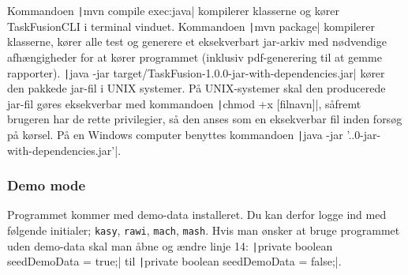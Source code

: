 Kommandoen \texttt|mvn compile exec:java| kompilerer klasserne og kører TaskFusionCLI i terminal vinduet.\newline
Kommandoen \texttt|mvn package| kompilerer klasserne, kører alle test og generere et eksekverbart jar-arkiv med nødvendige afhængigheder for at kører programmet (inklusiv pdf-generering til at gemme rapporter).\newline
\texttt|java -jar target/TaskFusion-1.0.0-jar-with-dependencies.jar| kører den pakkede jar-fil i UNIX systemer. På UNIX-systemer skal den producerede jar-fil gøres eksekverbar med kommandoen \texttt|chmod +x [filnavn]|, såfremt brugeren har de rette privilegier, så den anses som en eksekverbar fil inden forsøg på kørsel. På en Windows computer benyttes kommandoen \texttt|java -jar '.\target{}.0-jar-with-dependencies.jar'|.
\subsubsection{Demo mode}
Programmet kommer med demo-data installeret. Du kan derfor logge ind med følgende initialer; \texttt{kasy}, \texttt{rawi}, \texttt{mach}, \texttt{mash}. Hvis man ønsker at bruge programmet uden demo-data skal man åbne  og ændre linje 14:\newline
\texttt|private boolean seedDemoData = true;| til \texttt|private boolean seedDemoData = false;|.
